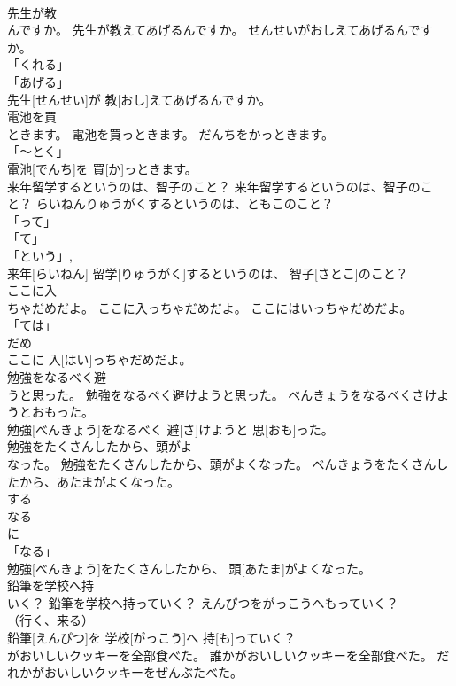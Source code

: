 \documentclass[8pt]{extreport}
\begin{document}
\begin{CJK}{UTF8}{min}
\\	先生が教
\\	んですか。	先生が教えてあげるんですか。	せんせいがおしえてあげるんですか。	
\\	「くれる」 
\\	「あげる」 
\\	先生[せんせい]が 教[おし]えてあげるんですか。		
\\	電池を買
\\	ときます。	電池を買っときます。	だんちをかっときます。	
\\	「～とく」 
\\	電池[でんち]を 買[か]っときます。		
\\	来年留学するというのは、智子のこと？	来年留学するというのは、智子のこと？	らいねんりゅうがくするというのは、ともこのこと？	
\\	「って」 
\\	「て」 
\\	「という」, 
\\	来年[らいねん] 留学[りゅうがく]するというのは、 智子[さとこ]のこと？		
\\	ここに入
\\	ちゃだめだよ。	ここに入っちゃだめだよ。	ここにはいっちゃだめだよ。	
\\	「ては」
\\	だめ
\\	ここに 入[はい]っちゃだめだよ。		
\\	勉強をなるべく避
\\	うと思った。	勉強をなるべく避けようと思った。	べんきょうをなるべくさけようとおもった。	
\\	勉強[べんきょう]をなるべく 避[さ]けようと 思[おも]った。		
\\	勉強をたくさんしたから、頭がよ
\\	なった。	勉強をたくさんしたから、頭がよくなった。	べんきょうをたくさんしたから、あたまがよくなった。	
\\	する 
\\	なる 
\\	に 
\\	「なる」 
\\	勉強[べんきょう]をたくさんしたから、 頭[あたま]がよくなった。		
\\	鉛筆を学校へ持
\\	いく？	鉛筆を学校へ持っていく？	えんぴつをがっこうへもっていく？	
\\	（行く、来る） 
\\	鉛筆[えんぴつ]を 学校[がっこう]へ 持[も]っていく？		
\\	がおいしいクッキーを全部食べた。	誰かがおいしいクッキーを全部食べた。	だれかがおいしいクッキーをぜんぶたべた。	

\end{CJK}
\end{document}
